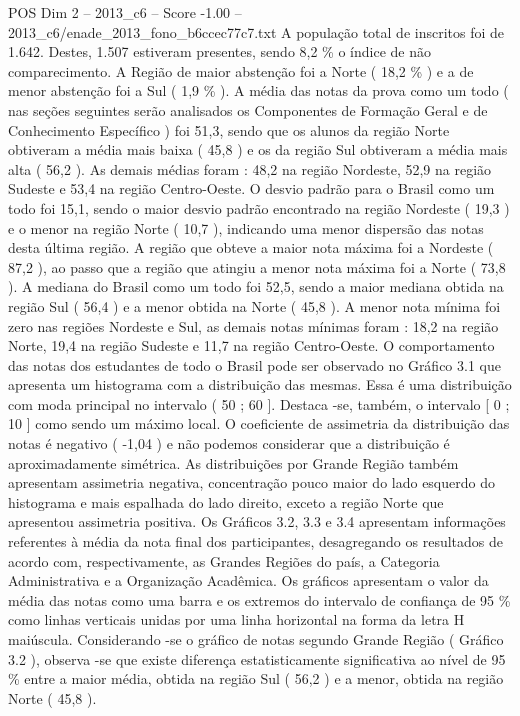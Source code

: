 \begin{textsample}{POS Dim 2 – 2013\_c6 – Score -1.00 – 2013\_c6/enade\_2013\_fono\_b6ccec77c7.txt}
A população total de inscritos foi de 1.642.
Destes, 1.507 estiveram presentes, sendo 8,2 \% o índice de não comparecimento.
A Região de maior abstenção foi a Norte ( 18,2 \% ) e a de menor abstenção foi a Sul ( 1,9 \% ).
A média das notas da prova como um todo ( nas seções seguintes serão analisados os Componentes de Formação Geral e de Conhecimento Específico ) foi 51,3, sendo que os alunos da região Norte obtiveram a média mais baixa ( 45,8 ) e os da região Sul obtiveram a média mais alta ( 56,2 ).
As demais médias foram : 48,2 na região Nordeste, 52,9 na região Sudeste e 53,4 na região Centro-Oeste.
O desvio padrão para o Brasil como um todo foi 15,1, sendo o maior desvio padrão encontrado na região Nordeste ( 19,3 ) e o menor na região Norte ( 10,7 ), indicando uma menor dispersão das notas desta última região.
A região que obteve a maior nota máxima foi a Nordeste ( 87,2 ), ao passo que a região que atingiu a menor nota máxima foi a Norte ( 73,8 ).
A mediana do Brasil como um todo foi 52,5, sendo a maior mediana obtida na região Sul ( 56,4 ) e a menor obtida na Norte ( 45,8 ).
A menor nota mínima foi zero nas regiões Nordeste e Sul, as demais notas mínimas foram : 18,2 na região Norte, 19,4 na região Sudeste e 11,7 na região Centro-Oeste.
O comportamento das notas dos estudantes de todo o Brasil pode ser observado no Gráfico 3.1 que apresenta um histograma com a distribuição das mesmas.
Essa é uma distribuição com moda principal no intervalo ( 50 ; 60 ].
Destaca -se, também, o intervalo [ 0 ; 10 ] como sendo um máximo local.
O coeficiente de assimetria da distribuição das notas é negativo ( -1,04 ) e não podemos considerar que a distribuição é aproximadamente simétrica.
As distribuições por Grande Região também apresentam assimetria negativa, concentração pouco maior do lado esquerdo do histograma e mais espalhada do lado direito, exceto a região Norte que apresentou assimetria positiva.
Os Gráficos 3.2, 3.3 e 3.4 apresentam informações referentes à média da nota final dos participantes, desagregando os resultados de acordo com, respectivamente, as Grandes Regiões do país, a Categoria Administrativa e a Organização Acadêmica.
Os gráficos apresentam o valor da média das notas como uma barra e os extremos do intervalo de confiança de 95 \% como linhas verticais unidas por uma linha horizontal na forma da letra H maiúscula.
Considerando -se o gráfico de notas segundo Grande Região ( Gráfico 3.2 ), observa -se que existe diferença estatisticamente significativa ao nível de 95 \% entre a maior média, obtida na região Sul ( 56,2 ) e a menor, obtida na região Norte ( 45,8 ).

\end{textsample}
